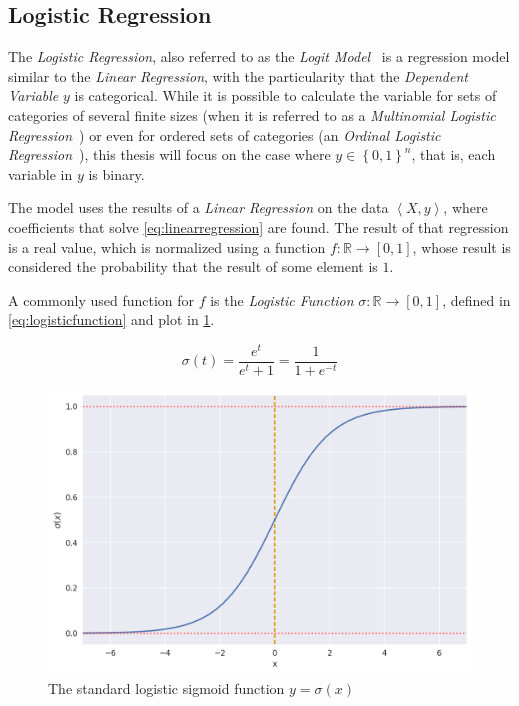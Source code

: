 \subsection{Logistic Regression}
\label{subsec:logisticregression}

The \emph{Logistic Regression}, also referred to as the \emph{Logit Model}~\cite{freedman2009statistical} is a regression model similar to the \emph{Linear Regression}, with the particularity that the \emph{Dependent Variable} $y$ is categorical. While it is possible to calculate the variable for sets of categories of several finite sizes (when it is referred to as a \emph{Multinomial Logistic Regression}~\cite{greene_econometric_2011}) or even for ordered sets of categories (an \emph{Ordinal Logistic Regression}~\cite{mccullagh1980ordinal}), this thesis will focus on the case where $y \in {\left\{ 0, 1 \right\}}^n$, that is, each variable in $y$ is binary.

The model uses the results of a \emph{Linear Regression} on the data $\left< X, y \right>$, where coefficients that solve \cref{eq:linearregression} are found. The result of that regression is a real value, which is normalized using a function $f : \mathbb{R} \rightarrow \left[ 0, 1 \right]$, whose result is considered the probability that the result of some element is $1$.

A commonly used function for $f$ is the \emph{Logistic Function} $\sigma : \mathbb{R} \rightarrow \left[ 0, 1 \right]$, defined in \cref{eq:logisticfunction} and plot in \cref{fig:sigmoid}.

\begin{equation}
\label{eq:logisticfunction}
\sigma \left( t \right) = \frac{e^t}{e^t + 1} = \frac{1}{1 + e^{-t}}
\end{equation}

\begin{figure}
\centering
\includegraphics[height=.33\textheight]{figures/sigmoid.png}
\caption{The standard logistic sigmoid function $y = \sigma(x)$}
\label{fig:sigmoid}
\end{figure}

